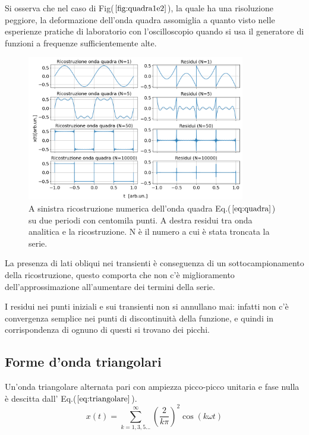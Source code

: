 \documentclass{article}
\begin{document}
        \noindent Si osserva che nel caso di Fig($\ref{fig:quadra1e2}$),
        la quale ha una risoluzione  peggiore, la deformazione dell'onda quadra assomiglia a quanto visto nelle esperienze 
        pratiche di laboratorio con l'oscilloscopio quando si usa il generatore di funzioni a
        frequenze sufficientemente alte.\\

        \begin{figure}[htbp]
            \centering
            \includegraphics[width=0.85\textwidth]{fousquarewave1e5.png} %
            \caption{A sinistra ricostruzione numerica dell'onda quadra Eq.($\ref{eq:quadra}$) su
                    due periodi con centomila punti.
                    A destra residui tra onda analitica e la ricostruzione.
                    N è il numero a cui è stata troncata la serie.}            \label{fig:quadra1e5}
        \end{figure}  
        
        
        \noindent La presenza di lati obliqui nei transienti è conseguenza di un sottocampionamento
        della ricostruzione, questo comporta che non c'è miglioramento dell'approssimazione all'aumentare dei termini 
        della serie.

        \noindent I residui nei punti iniziali e sui transienti non si annullano mai:  
        infatti non c'è convergenza semplice nei punti di discontinuità 
        della funzione, e quindi in corrispondenza di ognuno di
        questi  si trovano dei picchi. \newline \newline


    \subsection{Forme d'onda triangolari}
        \label{sez:trian}
        Un'onda triangolare alternata pari con ampiezza picco-picco unitaria
        e fase nulla è descitta dall' Eq.($\ref{eq:triangolare}$).
        \begin{equation}
            x(t) = \sum_{k=1,3,5...}^{\infty} \left(\frac{2}{k\pi}\right)^{2}\cos\left(k\omega t\right)
            \label{eq:triangolare}
        \end{equation}
\end{document}
